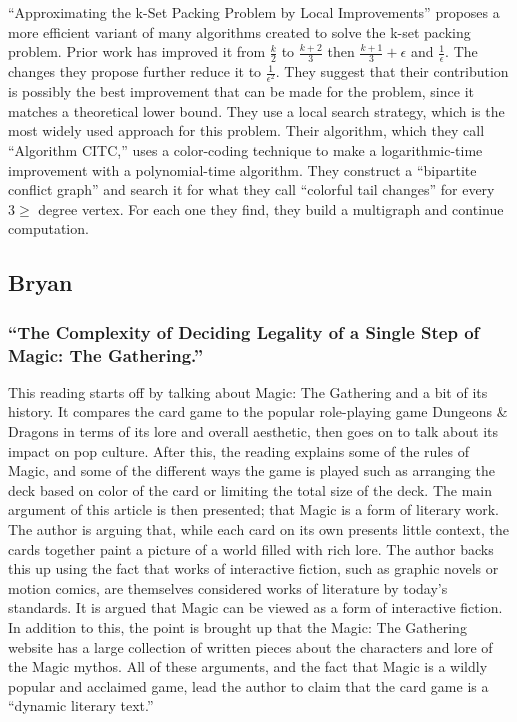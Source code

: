 \documentclass[12pt, letterpaper]{article}
\begin{document}
\enquote{Approximating the k-Set Packing Problem by Local Improvements}
proposes a more efficient variant of many algorithms created to solve the k-set packing problem.
Prior work has improved it from $ \frac{k}{2} $ to $ \frac{k + 2}{3} $
then $ \frac{k + 1}{3} + \epsilon $ and $ \frac{1}{\epsilon} $.
The changes they propose further reduce it to $ \frac{1}{\epsilon^2} $.
They suggest that their contribution is possibly the best improvement that can be made for the problem,
since it matches a theoretical lower bound.
They use a local search strategy,
which is the most widely used approach for this problem.
Their algorithm, which they call \enquote{Algorithm CITC,}
uses a color-coding technique to make a logarithmic-time improvement with a polynomial-time algorithm.
They construct a \enquote{bipartite conflict graph}
and search it for what they call \enquote{colorful tail changes} for every $ 3 \ge $ degree vertex.
For each one they find,
they build a multigraph and continue computation.

\subsection{Bryan}

\subsubsection{\enquote{The Complexity of Deciding Legality of a Single Step of Magic: The Gathering.}}

This reading starts off by talking about Magic: The Gathering and a bit of its history.
It compares the card game to the popular role-playing game
Dungeons \& Dragons in terms of its lore and overall aesthetic,
then goes on to talk about its impact on pop culture.
After this, the reading explains some of the rules of Magic,
and some of the different ways the game is played such as arranging the deck based on color of the card or
limiting the total size of the deck.
The main argument of this article is then presented;
that Magic is a form of literary work.
The author is arguing that,
while each card on its own presents little context,
the cards together paint a picture of a world filled with rich lore.
The author backs this up using the fact that works of interactive fiction,
such as graphic novels or motion comics,
are themselves considered works of literature by today’s standards.
It is argued that Magic can be viewed as a form of interactive fiction.
In addition to this, the point is brought up that the Magic: The Gathering website
has a large collection of written pieces about the characters and lore of the Magic mythos.
All of these arguments, and the fact that Magic is a wildly popular and acclaimed game,
lead the author to claim that the card game is a \enquote{dynamic literary text.}
\end{document}
